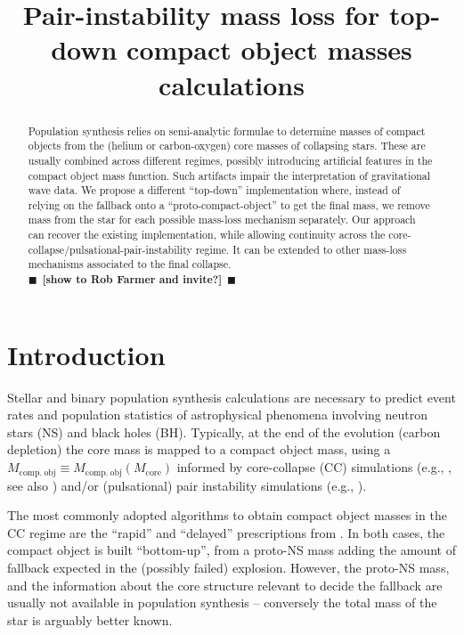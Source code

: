 \documentclass[twocolumn]{aastex63}
\newcommand{\todo}[1]{{\large $\blacksquare$~\textbf{\color{red}[#1]}}~$\blacksquare$}
\begin{document}
\title{Pair-instability mass loss for top-down compact object masses calculations}


\begin{abstract}
  Population synthesis relies on semi-analytic formulae to determine
  masses of compact objects from the (helium or carbon-oxygen) core
  masses of collapsing stars. These are usually combined across
  different regimes, possibly introducing artificial features in the
  compact object mass function. Such artifacts impair the
  interpretation of gravitational wave data. We propose a different
  ``top-down'' implementation where, instead of relying on the
  fallback onto a ``proto-compact-object'' to get
  the final mass, we remove mass from the star for
  each possible mass-loss mechanism separately. Our approach can recover the existing
  implementation, while allowing continuity across the
  core-collapse/pulsational-pair-instability regime. It can be
  extended
  to other mass-loss mechanisms associated to the final collapse.\\

  \todo{show to Rob Farmer and invite?}
\end{abstract}

\section{Introduction}

Stellar and binary population synthesis calculations are necessary to
predict event rates and population statistics of astrophysical
phenomena involving neutron stars (NS) and
black holes (BH). Typically, at the end of the evolution (carbon
depletion) the core mass is mapped to a compact object mass, using a
$M_\mathrm{comp.\ obj}\equiv M_\mathrm{comp.\ obj}(M_\mathrm{core})$
informed by core-collapse (CC) simulations (e.g., \citealt{fryer:12,
  spera:15, mandel:20, couch:20}, see also \citealt{zapartas:21, patton:21}) and/or (pulsational) pair instability simulations
(e.g., \citealt{belczynski:16, woosley:17, spera:17, stevenson:19,
  marchant:19, farmer:19, costa:21}).

The most commonly adopted algorithms to obtain compact object masses
in the CC regime are the ``rapid'' and ``delayed''
prescriptions from \cite{fryer:12}. In both cases, the compact object
is built ``bottom-up'', from a proto-NS mass adding the amount of
fallback expected in the (possibly failed) explosion. However, the
proto-NS mass, and the information about the core structure relevant
to decide the fallback are usually not available in population
synthesis \citep[e.g.,][]{patton:20} -- conversely the total mass of
the star is arguably better known. %
\end{document}
